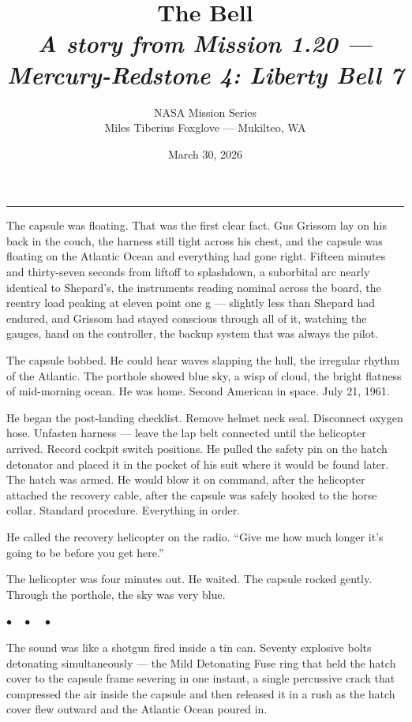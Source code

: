 \documentclass[12pt, letterpaper]{article}
\title{\Huge\textbf{The Bell}\\[0.5em]\large\textit{A story from Mission 1.20 --- Mercury-Redstone 4: Liberty Bell 7}}
\author{NASA Mission Series\\[0.3em]\small Miles Tiberius Foxglove --- Mukilteo, WA}
\date{March 30, 2026}
\begin{document}
\maketitle
\thispagestyle{empty}

\vspace{1em}
\noindent\rule{\textwidth}{0.4pt}
\vspace{1em}

\noindent The capsule was floating. That was the first clear fact. Gus Grissom lay on his back in the couch, the harness still tight across his chest, and the capsule was floating on the Atlantic Ocean and everything had gone right. Fifteen minutes and thirty-seven seconds from liftoff to splashdown, a suborbital arc nearly identical to Shepard's, the instruments reading nominal across the board, the reentry load peaking at eleven point one g --- slightly less than Shepard had endured, and Grissom had stayed conscious through all of it, watching the gauges, hand on the controller, the backup system that was always the pilot.

The capsule bobbed. He could hear waves slapping the hull, the irregular rhythm of the Atlantic. The porthole showed blue sky, a wisp of cloud, the bright flatness of mid-morning ocean. He was home. Second American in space. July 21, 1961.

He began the post-landing checklist. Remove helmet neck seal. Disconnect oxygen hose. Unfasten harness --- leave the lap belt connected until the helicopter arrived. Record cockpit switch positions. He pulled the safety pin on the hatch detonator and placed it in the pocket of his suit where it would be found later. The hatch was armed. He would blow it on command, after the helicopter attached the recovery cable, after the capsule was safely hooked to the horse collar. Standard procedure. Everything in order.

He called the recovery helicopter on the radio. ``Give me how much longer it's going to be before you get here.''

The helicopter was four minutes out. He waited. The capsule rocked gently. Through the porthole, the sky was very blue.

\begin{center}
$\bullet\quad\bullet\quad\bullet$
\end{center}

The sound was like a shotgun fired inside a tin can. Seventy explosive bolts detonating simultaneously --- the Mild Detonating Fuse ring that held the hatch cover to the capsule frame severing in one instant, a single percussive crack that compressed the air inside the capsule and then released it in a rush as the hatch cover flew outward and the Atlantic Ocean poured in.
\end{document}
